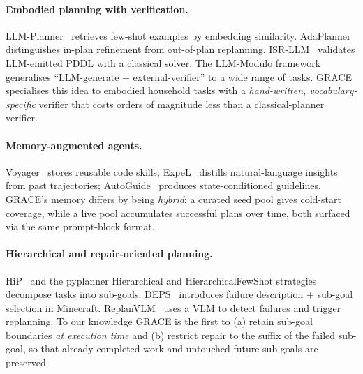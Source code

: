 \paragraph{Embodied planning with verification.}
LLM-Planner~\cite{song2023llmplanner} retrieves few-shot examples by
embedding similarity. AdaPlanner~\cite{sun2023adaplanner} distinguishes
in-plan refinement from out-of-plan replanning.
ISR-LLM~\cite{zhou2024isrllm} validates LLM-emitted PDDL with a
classical solver. The LLM-Modulo framework~\cite{kambhampati2024llmmodulo}
generalises ``LLM-generate + external-verifier'' to a wide range of
tasks. GRACE specialises this idea to embodied household tasks with a
\emph{hand-written, vocabulary-specific} verifier that costs orders of
magnitude less than a classical-planner verifier.

\paragraph{Memory-augmented agents.}
Voyager~\cite{wang2023voyager} stores reusable code skills;
ExpeL~\cite{zhao2024expel} distills natural-language insights from
past trajectories; AutoGuide~\cite{fu2024autoguide} produces
state-conditioned guidelines. GRACE's memory differs by being
\emph{hybrid}: a curated seed pool gives cold-start coverage, while a
live pool accumulates successful plans over time, both surfaced via
the same prompt-block format.

\paragraph{Hierarchical and repair-oriented planning.}
HiP~\cite{ajay2023hip} and the pyplanner Hierarchical and
HierarchicalFewShot strategies decompose tasks into sub-goals.
DEPS~\cite{wang2023deps} introduces failure description + sub-goal
selection in Minecraft. ReplanVLM~\cite{mei2024replanvlm} uses a VLM
to detect failures and trigger replanning. To our knowledge GRACE is
the first to (a) retain sub-goal boundaries \emph{at execution time}
and (b) restrict repair to the suffix of the failed sub-goal, so that
already-completed work and untouched future sub-goals are preserved.
